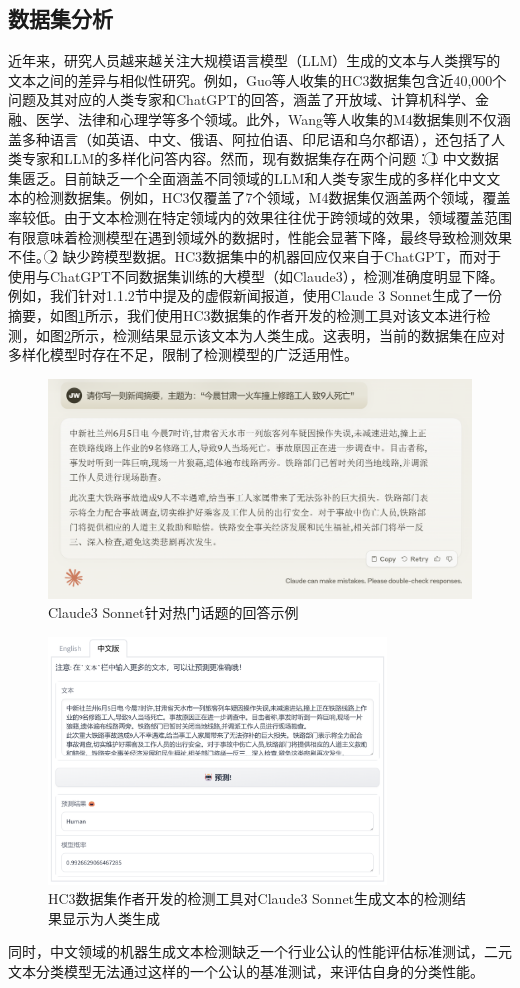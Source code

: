 \documentclass[a4paper]{report}
\begin{document}
\subsection{数据集分析}
近年来，研究人员越来越关注大规模语言模型（LLM）生成的文本与人类撰写的文本之间的差异与相似性研究。例如，Guo等人收集的HC3数据集包含近40,000个问题及其对应的人类专家和ChatGPT的回答，涵盖了开放域、计算机科学、金融、医学、法律和心理学等多个领域\cite{guo2023close}。此外，Wang等人收集的M4数据集则不仅涵盖多种语言（如英语、中文、俄语、阿拉伯语、印尼语和乌尔都语），还包括了人类专家和LLM的多样化问答内容\cite{wang2024llm}。然而，现有数据集存在两个问题：\textcircled{1} 中文数据集匮乏。目前缺乏一个全面涵盖不同领域的LLM和人类专家生成的多样化中文文本的检测数据集。例如，HC3仅覆盖了7个领域，M4数据集仅涵盖两个领域，覆盖率较低。由于文本检测在特定领域内的效果往往优于跨领域的效果，领域覆盖范围有限意味着检测模型在遇到领域外的数据时，性能会显著下降，最终导致检测效果不佳。\textcircled{2} 缺少跨模型数据。HC3数据集中的机器回应仅来自于ChatGPT，而对于使用与ChatGPT不同数据集训练的大模型（如Claude3），检测准确度明显下降。例如，我们针对1.1.2节中提及的虚假新闻报道，使用Claude 3 Sonnet生成了一份摘要，如图\ref{fig:Claude3_text}所示，我们使用HC3数据集的作者开发的检测工具对该文本进行检测，如图\ref{fig:Claude3_HC3}所示，检测结果显示该文本为人类生成。这表明，当前的数据集在应对多样化模型时存在不足，限制了检测模型的广泛适用性。
\begin{figure}[H]
	\centering
	\includegraphics[width=0.8\linewidth]{Claude3_text.png}
	\caption{Claude3 Sonnet针对热门话题的回答示例}
	\label{fig:Claude3_text}
\end{figure}
\begin{figure}[H]
	\centering
	\includegraphics[width=0.8\textwidth]{Claude3_HC3.png}
	\caption{HC3数据集作者开发的检测工具对Claude3 Sonnet生成文本的检测结果显示为人类生成}
	\label{fig:Claude3_HC3}
\end{figure}
同时，中文领域的机器生成文本检测缺乏一个行业公认的性能评估标准测试，二元文本分类模型无法通过这样的一个公认的基准测试，来评估自身的分类性能。
\end{document}
